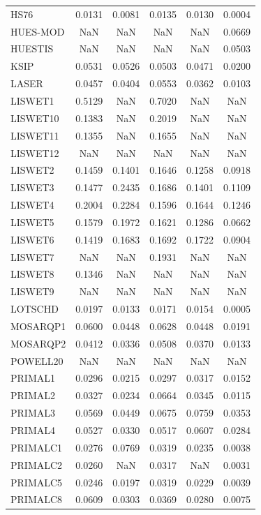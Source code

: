 \begin{longtable}{lccccc}
HS76 & 0.0131 & 0.0081 & 0.0135 & 0.0130 & 0.0004 \\
HUES-MOD & NaN & NaN & NaN & NaN & 0.0669 \\
HUESTIS & NaN & NaN & NaN & NaN & 0.0503 \\
KSIP & 0.0531 & 0.0526 & 0.0503 & 0.0471 & 0.0200 \\
LASER & 0.0457 & 0.0404 & 0.0553 & 0.0362 & 0.0103 \\
LISWET1 & 0.5129 & NaN & 0.7020 & NaN & NaN \\
LISWET10 & 0.1383 & NaN & 0.2019 & NaN & NaN \\
LISWET11 & 0.1355 & NaN & 0.1655 & NaN & NaN \\
LISWET12 & NaN & NaN & NaN & NaN & NaN \\
LISWET2 & 0.1459 & 0.1401 & 0.1646 & 0.1258 & 0.0918 \\
LISWET3 & 0.1477 & 0.2435 & 0.1686 & 0.1401 & 0.1109 \\
LISWET4 & 0.2004 & 0.2284 & 0.1596 & 0.1644 & 0.1246 \\
LISWET5 & 0.1579 & 0.1972 & 0.1621 & 0.1286 & 0.0662 \\
LISWET6 & 0.1419 & 0.1683 & 0.1692 & 0.1722 & 0.0904 \\
LISWET7 & NaN & NaN & 0.1931 & NaN & NaN \\
LISWET8 & 0.1346 & NaN & NaN & NaN & NaN \\
LISWET9 & NaN & NaN & NaN & NaN & NaN \\
LOTSCHD & 0.0197 & 0.0133 & 0.0171 & 0.0154 & 0.0005 \\
MOSARQP1 & 0.0600 & 0.0448 & 0.0628 & 0.0448 & 0.0191 \\
MOSARQP2 & 0.0412 & 0.0336 & 0.0508 & 0.0370 & 0.0133 \\
POWELL20 & NaN & NaN & NaN & NaN & NaN \\
PRIMAL1 & 0.0296 & 0.0215 & 0.0297 & 0.0317 & 0.0152 \\
PRIMAL2 & 0.0327 & 0.0234 & 0.0664 & 0.0345 & 0.0115 \\
PRIMAL3 & 0.0569 & 0.0449 & 0.0675 & 0.0759 & 0.0353 \\
PRIMAL4 & 0.0527 & 0.0330 & 0.0517 & 0.0607 & 0.0284 \\
PRIMALC1 & 0.0276 & 0.0769 & 0.0319 & 0.0235 & 0.0038 \\
PRIMALC2 & 0.0260 & NaN & 0.0317 & NaN & 0.0031 \\
PRIMALC5 & 0.0246 & 0.0197 & 0.0319 & 0.0229 & 0.0039 \\
PRIMALC8 & 0.0609 & 0.0303 & 0.0369 & 0.0280 & 0.0075 \\

\end{longtable}
